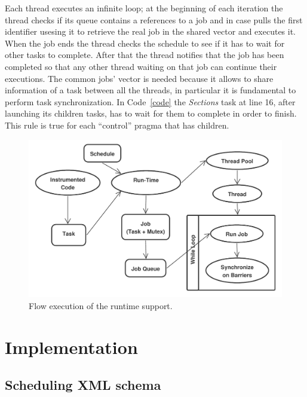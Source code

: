 \documentclass[a4paper,12pt,oneside]{book}
\begin{document}
Each thread executes an infinite loop; at the beginning of each iteration the thread checks if its queue contains a references to a job and in case pulls the first identifier usesing it to retrieve the real job in the shared vector and executes it. When the job ends the thread checks the schedule to see if it has to wait for other tasks to complete. After that the thread notifies that the job has been completed so that any other thread waiting on that job can continue their executions. The common jobs’ vector is needed because it allows to share information of a task between all the threads, in particular it is fundamental to perform task synchronization. In Code~\ref{code} the \emph{Sections} task at line 16, after launching its children tasks, has to wait for them to complete in order to finish. This rule is true for each “control” pragma that has children. 

\begin{figure}[H]
\centering
\includegraphics[scale=0.6]{runtime_execution.pdf}
\caption{Flow execution of the runtime support.}
\end{figure}


\chapter{Implementation}
\section{Scheduling XML schema}
\label{schedulexmlschema}
\end{document}
